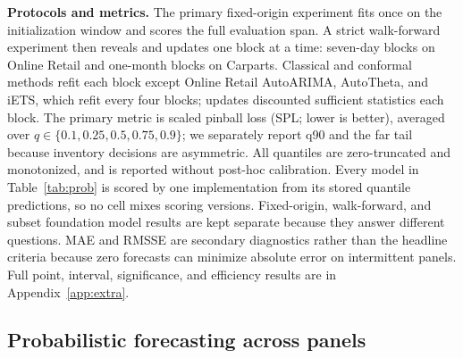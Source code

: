 \textbf{Protocols and metrics.} The primary fixed-origin experiment fits
once on the initialization window and scores the full evaluation span.
A strict walk-forward experiment then reveals and updates one block at a
time: seven-day blocks on Online Retail and one-month blocks on Carparts.
Classical and conformal methods refit each block except Online Retail
AutoARIMA, AutoTheta, and iETS, which refit every four blocks; \REMIX{}
updates discounted sufficient statistics each block. The primary metric is
scaled pinball loss (SPL; lower is better), averaged over
$q\in\{0.1,0.25,0.5,0.75,0.9\}$; we separately report q90 and the far tail
because inventory decisions are asymmetric. All quantiles are
zero-truncated and monotonized, and \REMIX{} is reported without post-hoc
calibration. Every model in Table~\ref{tab:prob} is scored by one
implementation from its stored quantile predictions, so no cell mixes
scoring versions. Fixed-origin, walk-forward, and subset foundation model
results are kept separate because they answer different questions. MAE and
RMSSE are secondary diagnostics rather than the headline criteria because
zero forecasts can minimize absolute error on intermittent panels. Full
point, interval, significance, and efficiency results are in
Appendix~\ref{app:extra}.

\subsection{Probabilistic forecasting across panels}
\label{sec:main-results}

